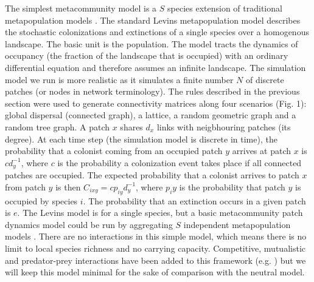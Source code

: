 \documentclass[12pt]{article}
\begin{document}
The simplest metacommunity model is a $S$ species extension of traditional
metapopulation models \parencite{Hanski1999}. The standard Levins metapopulation
model \parencite{Levins1969} describes the stochastic colonizations and
extinctions of a single species over a homogenous landscape. The basic unit is
the population. The model tracts the dynamics of occupancy (the fraction of the
landscape that is occupied) with an ordinary differential equation and therefore
assumes an infinite landscape. The simulation model we run is more realistic as
it simulates a finite number $N$ of discrete patches (or nodes in network
terminology). The rules described in the previous section were used to generate
connectivity matrices along four scenarios (Fig. 1): global dispersal (connected
graph), a lattice, a random geometric graph and a random tree graph. A patch $x$
shares $d_x$ links with neigbhouring patches (its degree). At each time step
(the simulation model is discrete in time), the probability that a colonist
coming from an occupied patch $y$ arrives at patch $x$ is $cd_y^{-1}$, where $c$
is the probability a colonization event takes place if all connected patches are
occupied. The expected probability that a colonist arrives to patch $x$ from
patch $y$ is then $C_{ixy}=cp_{iy}d_y^{-1}$, where $p_{i}y$ is the probability
that patch $y$ is occupied by species $i$. The probability that an extinction
occurs in a given patch is $e$. The Levins model is for a single species, but a
basic metacommunity patch dynamics model could be run by aggregating $S$
independent metapopulation models \parencite{Hanski1997}. There are no
interactions in this simple model, which means there is no limit to local
species richness and no carrying capacity. Competitive, mutualistic and
predator-prey interactions have been added to this framework (e.g.
\textcite{Tilman1994a,Holt1996,Klausmeier1998,Gravel2011b}) but we will keep this
model minimal for the sake of comparison with the neutral model.
\end{document}
